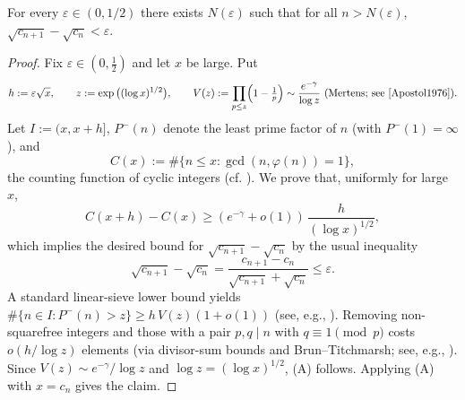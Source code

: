 \begin{theorem}\label{thm:visser_cyclics}
For every $\varepsilon\in(0,1/2)$ there exists $N(\varepsilon)$ such that for all $n>N(\varepsilon)$, $\sqrt{c_{n+1}}-\sqrt{c_n}<\varepsilon$.
\end{theorem}

\begin{proof}
Fix $\varepsilon\in(0,\tfrac12)$ and let $x$ be large. Put
$$
 h:=\varepsilon\sqrt x,\qquad z:=\exp\big((\log x)^{1/2}\big),\qquad V(z):=\prod_{p\le z}\Bigl(1-\tfrac1p\Bigr)\sim\frac{e^{-\gamma}}{\log z}\ \text{(Mertens; see \cite{Apostol1976}).}
$$
Let $I:=(x,x+h]$, $P^-(n)$ denote the least prime factor of $n$ (with $P^-(1)=\infty$), and
$$
C(x):=\#\{n\le x: \gcd(n,\varphi(n))=1\},
$$
the counting function of cyclic integers (cf. \cite{Pollack2022}). We prove that, uniformly for large $x$,
$$
C(x+h)-C(x)\ge (e^{-\gamma}+o(1))\,\frac{h}{(\log x)^{1/2}},\tag{A}
$$
which implies the desired bound for $\sqrt{c_{n+1}}-\sqrt{c_n}$ by the usual inequality
$$
\sqrt{c_{n+1}}-\sqrt{c_n}=\frac{c_{n+1}-c_n}{\sqrt{c_{n+1}}+\sqrt{c_n}}\le \varepsilon.
$$
A standard linear-sieve lower bound yields $\#\{n\in I:P^-(n)>z\}\ge h\,V(z)(1+o(1))$ (see, e.g., \cite{HalRich1974,IK2004}). Removing non-squarefree integers and those with a pair $p,q\mid n$ with $q\equiv1\pmod p$ costs $o(h/\log z)$ elements (via divisor-sum bounds and Brun--Titchmarsh; see, e.g., \cite{MV2007,IK2004}). Since $V(z)\sim e^{-\gamma}/\log z$ and $\log z=(\log x)^{1/2}$, (A) follows. Applying (A) with $x=c_n$ gives the claim.
\end{proof}
